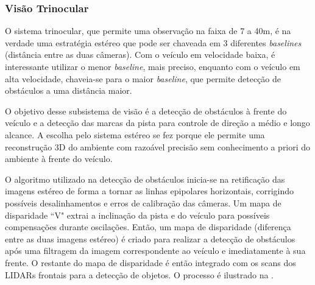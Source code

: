\subsubsection{Visão Trinocular}

O sistema trinocular, que permite uma observação na faixa de 7 a 40m, é na verdade uma estratégia estéreo que pode ser chaveada em 3 diferentes \emph{baselines} (distância entre as duas câmeras). Com o veículo em velocidade baixa, é interessante utilizar o menor \emph{baseline}, mais preciso, enquanto com o veículo em alta velocidade, chaveia-se para o maior \emph{baseline}, que permite detecção de obstáculos a uma distância maior.

O objetivo desse subsistema de visão é a detecção de obstáculos à frente do veículo e a detecção das marcas da pista para controle de direção a médio e longo alcance. A escolha pelo sistema estéreo se fez porque ele permite uma reconstrução 3D do ambiente com razoável precisão sem conhecimento a priori do ambiente à frente do veículo.

O algoritmo utilizado na detecção de obstáculos inicia-se na retificação das imagens estéreo de forma a tornar as linhas epipolares horizontais, corrigindo possíveis desalinhamentos e erros de calibração das câmeras. Um mapa de disparidade ``V" extrai a inclinação da pista e do veículo para possíveis compensações durante oscilações. Então, um mapa de disparidade (diferença entre as duas imagens estéreo) é criado para realizar a detecção de obstáculos após uma filtragem da imagem correspondente ao veículo e imediatamente à sua frente. O restante do mapa de disparidade é então integrado com os scans dos LIDARs frontais para a detecção de objetos. O processo é ilustrado na .

